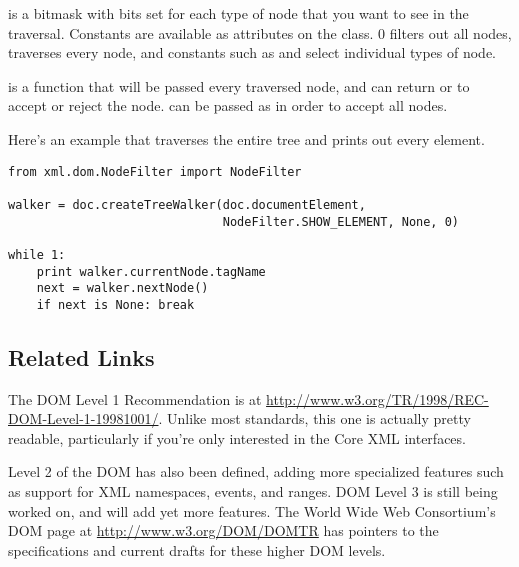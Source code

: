 \documentclass{howto}
\begin{document}
 is a bitmask with bits set for each type of node that
you want to see in the traversal.  Constants are available 
as attributes on the  class.
0 filters out all nodes,  traverses
every node, and constants such as 
and  select individual types of node.

 is a function that will be passed every traversed node,
and can return  or
 to accept or reject the node.
 can be passed as  in order to accept all
nodes.


Here's an example that traverses the entire tree and prints out every
element.

\begin{verbatim}
from xml.dom.NodeFilter import NodeFilter

walker = doc.createTreeWalker(doc.documentElement,
                              NodeFilter.SHOW_ELEMENT, None, 0)

while 1:
    print walker.currentNode.tagName
    next = walker.nextNode()
    if next is None: break
\end{verbatim}







\subsection{Related Links}

The DOM Level 1 Recommendation is at
\url{http://www.w3.org/TR/1998/REC-DOM-Level-1-19981001/}.  Unlike most
standards, this one is actually pretty readable, particularly if you're only
interested in the Core XML interfaces.

Level 2 of the DOM has also been defined, adding more specialized
features such as support for XML namespaces, events, and ranges.  DOM
Level 3 is still being worked on, and will add yet more features.  The
World Wide Web Consortium's DOM page at \url{http://www.w3.org/DOM/DOMTR}
has pointers to the specifications and current drafts for these higher
DOM levels.
\end{document}
